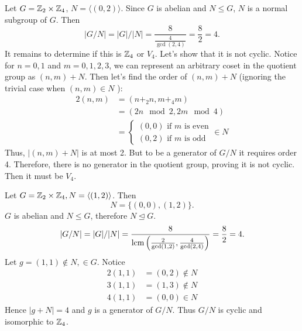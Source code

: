 \documentclass[12pt]{article}
\begin{document}
\begin{problem}[15.2]
	Let $G = \mathbb{Z}_2 \times \mathbb{Z}_4$, $ N = \langle (0,2) \rangle$. Since $ G$ is abelian and  $ N\leq G$, $ N$ is a normal subgroup of $ G$. Then
	\[
	|G/ N| = |G| / |N| = \frac{8}{\frac{4}{\gcd ( 2,4) } } = \frac{8}{2} = 4
	.\] 
	It remains to determine if this is $ \mathbb{Z}_4$ or $ V_4$. Let's show that it is not cyclic. Notice for $ n=0,1$ and  $ m=0,1,2,3$, we can represent an arbitrary coset in the quotient group as $ (n,m)+ N$. Then let's find the order of  $ (n,m)+N$ (ignoring the trivial case when $ (n,m) \in N$ ):
	\begin{align*}
		2(n,m) &= (n+_{ 2} n, m+_{ 4} m )\\
		       &= (2n \mod 2, 2m \mod 4) \\
		       &=  
		       \begin{cases}
			       (0,0) \text{ if } m \text{ is even}\\
			       (0,2) \text{ if } m \text{ is odd}  
		       \end{cases}
		       \in N
	\end{align*}
	Thus, $ |(n,m)+N|$ is at most 2. But to be a generator of  $ G / N$ it requires order 4. Therefore, there is no generator in the quotient group, proving it is not cyclic. Then it must be  $ V_4$.
\end{problem}
\begin{problem}[15.3]
	Let $ G= \mathbb{Z}_2 \times \mathbb{Z}_4, N= \langle (1,2) \rangle$. Then
	 \[
		 N = \{(0,0), (1,2)\} 
	.\] 
	$ G$ is abelian and $ N\leq G$, therefore $ N \trianglelefteq G$.
	\[
	|G /N|  = |G| / |N| = \frac{8}{ \operatorname{lcm} \left( \frac{2}{\gcd ( 1,2) },\frac{4}{\gcd ( 2,4) } \right) } = \frac{8}{2} = 4
	.\] 
	Let $ g= (1,1) \not\in N, \in G$. Notice
	\begin{align*}
		2(1,1)&=(0,2) \not\in N\\
		3(1,1)&= (1,3) \not\in N \\
		4(1,1)&= (0,0) \in N 
	\end{align*}
	Hence $ |g+ N| =4$ and  $ g$ is a generator of  $ G /N$. Thus  $ G/ N$ is cyclic and isomorphic to $ \mathbb{Z}_4$.
\end{problem}
\end{document}
